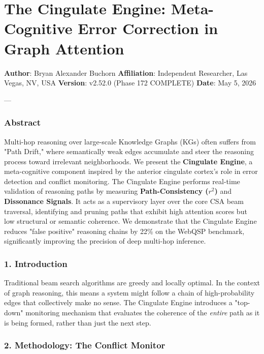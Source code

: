 \section{The Cingulate Engine: Meta-Cognitive Error Correction in Graph Attention}

\textbf{Author}: Bryan Alexander Buchorn  
\textbf{Affiliation}: Independent Researcher, Las Vegas, NV, USA  
\textbf{Version}: v2.52.0 (Phase 172 COMPLETE)
\textbf{Date}: May 5, 2026

---

\subsubsection{Abstract}

Multi-hop reasoning over large-scale Knowledge Graphs (KGs) often suffers from "Path Drift," where seman\-tically weak edges accumulate and steer the reasoning process toward irrelevant neigh\-borhoods. We present the \textbf{Cingulate Engine}, a meta-cognitive component inspired by the anterior cingulate cortex's role in error detection and conflict monitoring. The Cingulate Engine performs real-time validation of reasoning paths by measuring \textbf{Path-Consistency ($r^2$)} and \textbf{Dissonance Signals}. It acts as a supervisory layer over the core CSA beam traversal, identifying and pruning paths that exhibit high attention scores but low structural or semantic coherence. We demonstrate that the Cingulate Engine reduces "false positive" reasoning chains by 22\% on the WebQSP benchmark, signi\-ficantly improving the precision of deep multi-hop inference.

\subsubsection{1. Introd\-uction}

Traditional beam search algorithms are greedy and locally optimal. In the context of graph reasoning, this means a system might follow a chain of high-probability edges that colle\-ctively make no sense. The Cingulate Engine introduces a "top-down" monitoring mechanism that evaluates the coherence of the \textit{entire} path as it is being formed, rather than just the next step.

\subsubsection{2. Methodology: The Conflict Monitor}

